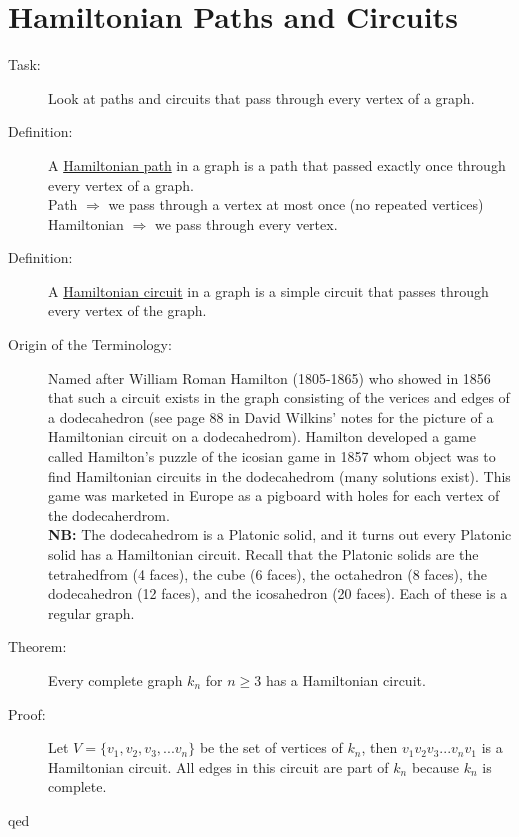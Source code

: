 \documentclass[10pt]{article}
\begin{document}
	\section{Hamiltonian Paths and Circuits}
	\begin{description}
		\item[Task:] Look at paths and circuits that pass through every vertex of a graph.
		\item[Definition:] A \underline{Hamiltonian path} in a graph is a path that passed exactly once through every vertex of a graph. \\
		Path $\Rightarrow$ we pass through a vertex at most once (no repeated vertices) \\
		Hamiltonian $\Rightarrow$ we pass through every vertex.
		\item[Definition:] A \underline{Hamiltonian circuit} in a graph is a simple circuit that passes through every vertex of the graph.
		\item[Origin of the Terminology:] Named after William Roman Hamilton (1805-1865) who showed in 1856 that such a circuit exists in the graph consisting of the verices and edges of a dodecahedron (see page 88 in David Wilkins' notes for the picture of a Hamiltonian circuit on a dodecahedrom). Hamilton developed a game called Hamilton's puzzle of the icosian game in 1857 whom object was to find Hamiltonian circuits in the dodecahedrom (many solutions exist). This game was marketed in Europe as a pigboard with holes for each vertex of the dodecaherdrom. \\
		\textbf{NB:} The dodecahedrom is a Platonic solid, and it turns out every Platonic solid has a Hamiltonian circuit. Recall that the Platonic solids are the tetrahedfrom (4 faces), the cube (6 faces), the octahedron (8 faces), the dodecahedron (12 faces), and the icosahedron (20 faces). Each of these is a regular graph.
		\item[Theorem:] Every complete graph $k_n$ for $n \geq 3$ has a Hamiltonian circuit.
		\item[Proof:] Let $V = \{v_1, v_2, v_3, ... v_n\}$ be the set of vertices of $k_n$, then $v_1 v_2 v_3 ... v_n v_1$ is a Hamiltonian circuit. All edges in this circuit are part of $k_n$ because $k_n$ is complete.
		\item[qed]
	\end{description}
	
\end{document}
